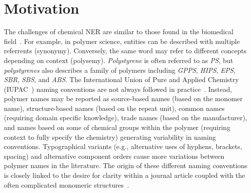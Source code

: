 \section{Motivation}
\label{sect:background}
The challenges of chemical NER are similar to those found in the biomedical field~\cite{krallinger2015chemdner,kim2004introduction}. 
For example, in polymer science, entities can be described with multiple referrents (synonymy).
Conversely, the same word may refer to different concepts depending on context (polysemy).
\textit{Polystyrene} is often referred to as \textit{PS}, but \textit{polystyrenes} also describes a family of polymers including \textit{GPPS}, \textit{HIPS}, \textit{EPS}, \textit{SBR}, \textit{SBS}, and \textit{ABS}. 
The International Union of Pure and Applied Chemistry (IUPAC~\cite{hiorns2013brief}) naming conventions are not always followed in practice~\cite{tamames2006success}. 
Instead, polymer names may be reported as source-based names (based on the monomer name), structure-based names (based on the repeat unit), common names (requiring domain specific knowledge), trade names (based on the manufacturer), and names based on some of chemical groups within the polymer (requiring context to fully specify the chemistry) generating variability in naming conventions.
Typographical variants (e.g., alternative uses of hyphens, brackets, spacing) and alternative component orders cause more variations between polymer names in the literature.
The origin of these different naming conventions is closely linked to the desire for clarity within a journal article coupled with the often complicated monomeric structures~\cite{audus2017polymer}.

